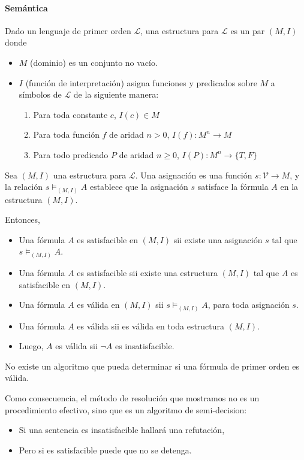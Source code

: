 \paragraph{Semántica}

Dado un lenguaje de primer orden $\mathcal{L}$, una estructura para $\mathcal{L}$ es un par $(M,I)$ donde
\begin{itemize}
  \item $M$ (dominio) es un conjunto no vacío.
  \item $I$ (función de interpretación) asigna funciones y predicados sobre $M$ a símbolos de $\mathcal{L}$ de la siguiente manera:
  \begin{enumerate}
    \item Para toda constante $c$, $I(c) \in M$
    \item Para toda función $f$ de aridad $n > 0$, $I(f): M^n \to M$
    \item Para todo predicado $P$ de aridad $n \geq 0$, $I(P) : M^n \to \{T,F\}$
  \end{enumerate}
\end{itemize}

Sea $(M,I)$ una estructura para $\mathcal{L}$. Una asignación es una función $s:\mathcal{V} \to M$, y la relación $s \models_{(M,I)} A$ establece que la asignación $s$ satisface la fórmula $A$ en la estructura $(M,I)$.

Entonces,
\begin{itemize}
  \item Una fórmula $A$ es satisfacible en $(M,I)$ sii existe una asignación $s$ tal que $s \models_{(M,I)} A$.
  \item Una fórmula $A$ es satisfacible sii existe una estructura $(M,I)$ tal que $A$ es satisfacible en $(M,I)$.
  \item Una fórmula $A$ es válida en $(M,I)$ sii $s \models_{(M,I)} A$, para toda asignación $s$.
  \item Una fórmula $A$ es válida sii es válida en toda estructura $(M,I)$.
  \item Luego, $A$ es válida sii $\lnot A$ es insatisfacible.
\end{itemize}

\begin{teo}
  No existe un algoritmo que pueda determinar si una fórmula de primer orden es válida.

  Como consecuencia, el método de resolución que mostramos no es un procedimiento efectivo, sino que es un algoritmo de semi-decision:
  \begin{itemize}
    \item Si una sentencia es insatisfacible hallará una refutación,
    \item Pero si es satisfacible puede que no se detenga.
  \end{itemize}
\end{teo}

